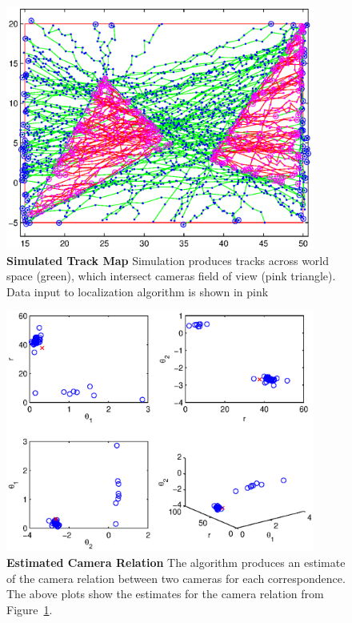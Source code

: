 \documentclass[journal]{IEEEtran}
\begin{document}
	\begin{figure}
		\centering
		\includegraphics[width=4in]{./paths.eps}
		\caption{\textbf{Simulated Track Map}  Simulation produces tracks across world 
										space (green), which intersect cameras 
										field of view (pink triangle). Data input to
										localization algorithm is shown in pink}
		\label{paths}
	\end{figure}

	\begin{figure}
		\centering
		\includegraphics[width=4in]{./point_cloud.eps}
		\caption{\textbf{Estimated Camera Relation} The algorithm produces an estimate 
											of the camera relation between two
											cameras for each correspondence. 
											The above plots show the estimates
											for the camera relation from
											Figure~\ref{paths}.}
		\label{point_cloud}
	\end{figure}

	
\end{document}

